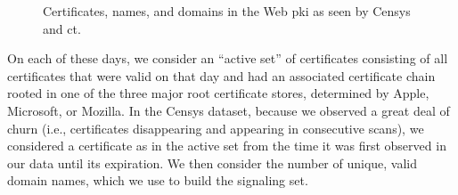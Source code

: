 \begin{figure}
  \centering
  \caption{Certificates, names, and domains in the Web \ac{pki} as seen by
  Censys and \ac{ct}. }
  \label{fig:count}
\end{figure}

On each of these days, we consider an ``active set'' of certificates consisting
of all certificates that were valid on that day and had an associated
certificate chain rooted in one of the three major root certificate stores,
determined by Apple, Microsoft, or Mozilla. In the Censys dataset, because we
observed a great deal of churn (i.e., certificates disappearing and appearing in
consecutive scans), we considered a certificate as in the active set from the
time it was first observed in our data until its expiration. We then consider
the number of unique, valid domain names, which we use to build the signaling
set. 

